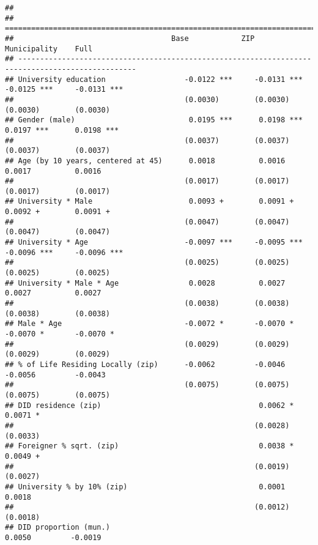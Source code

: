 \documentclass[
]{article}
\begin{document}
\begin{verbatim}
## 
## =================================================================================================
##                                    Base            ZIP             Municipality    Full          
## -------------------------------------------------------------------------------------------------
## University education                  -0.0122 ***     -0.0131 ***     -0.0125 ***     -0.0131 ***
##                                       (0.0030)        (0.0030)        (0.0030)        (0.0030)   
## Gender (male)                          0.0195 ***      0.0198 ***      0.0197 ***      0.0198 ***
##                                       (0.0037)        (0.0037)        (0.0037)        (0.0037)   
## Age (by 10 years, centered at 45)      0.0018          0.0016          0.0017          0.0016    
##                                       (0.0017)        (0.0017)        (0.0017)        (0.0017)   
## University * Male                      0.0093 +        0.0091 +        0.0092 +        0.0091 +  
##                                       (0.0047)        (0.0047)        (0.0047)        (0.0047)   
## University * Age                      -0.0097 ***     -0.0095 ***     -0.0096 ***     -0.0096 ***
##                                       (0.0025)        (0.0025)        (0.0025)        (0.0025)   
## University * Male * Age                0.0028          0.0027          0.0027          0.0027    
##                                       (0.0038)        (0.0038)        (0.0038)        (0.0038)   
## Male * Age                            -0.0072 *       -0.0070 *       -0.0070 *       -0.0070 *  
##                                       (0.0029)        (0.0029)        (0.0029)        (0.0029)   
## % of Life Residing Locally (zip)      -0.0062         -0.0046         -0.0056         -0.0043    
##                                       (0.0075)        (0.0075)        (0.0075)        (0.0075)   
## DID residence (zip)                                    0.0062 *                        0.0071 *  
##                                                       (0.0028)                        (0.0033)   
## Foreigner % sqrt. (zip)                                0.0038 *                        0.0049 +  
##                                                       (0.0019)                        (0.0027)   
## University % by 10% (zip)                              0.0001                          0.0018    
##                                                       (0.0012)                        (0.0018)   
## DID proportion (mun.)                                                  0.0050         -0.0019    

\end{verbatim}
\end{document}
